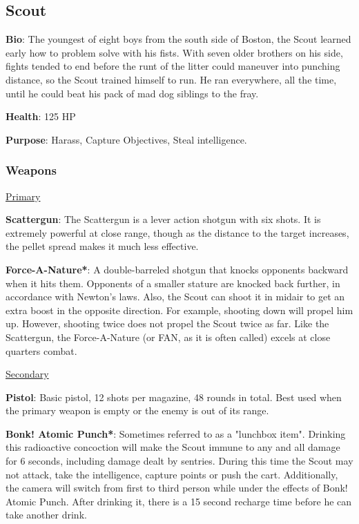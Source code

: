 \subsection{Scout}
{\bf Bio}:
The youngest of eight boys from the south side of Boston, the Scout learned early how to problem solve with his fists. With seven older brothers on his side, fights tended to end before the runt of the litter could maneuver into punching distance, so the Scout trained himself to run. He ran everywhere, all the time, until he could beat his pack of mad dog siblings to the fray.

{\bf Health}: 125 HP

{\bf Purpose}:
Harass, Capture Objectives, Steal intelligence.

\subsubsection {Weapons}

\begin {center}
\underline {Primary}
\end {center}

{\bf Scattergun}:  The Scattergun is a lever action shotgun with six shots. It is extremely powerful at close range, though as the distance to the target increases, the pellet spread makes it much less effective.

{\bf Force-A-Nature*}: A double-barreled shotgun that knocks opponents backward when it hits them.  Opponents of a smaller stature are knocked back further, in accordance with Newton's laws.  Also, the Scout can shoot it in midair to get an extra boost in the opposite direction.  For example, shooting down will propel him up. However, shooting twice does not propel the Scout twice as far. Like the Scattergun, the Force-A-Nature (or FAN, as it is often called) excels at close quarters combat.


\begin {center}
\underline {Secondary}
\end {center}

{\bf Pistol}: Basic pistol, 12 shots per magazine, 48 rounds in total. Best used when the primary weapon is empty or the enemy is out of its range.

{\bf Bonk! Atomic Punch*}: Sometimes referred to as a "lunchbox item". Drinking this radioactive concoction will make the Scout immune to any and all damage for 6 seconds, including damage dealt by sentries. During this time the Scout may not attack, take the intelligence, capture points or push the cart. Additionally, the camera will switch from first to third person while under the effects of Bonk! Atomic Punch. After drinking it, there is a 15 second recharge time before he can take another drink.

